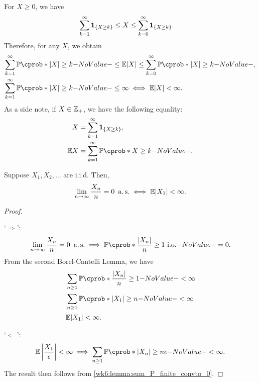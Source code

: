 \documentclass[12pt]{article}
\begin{document}
%
For $X \geq 0$, we have
\begin{align*}
\sum_{k=1}^{\infty} {\bf 1}_{\{X \geq k\}} &\leq X \leq \sum_{k=0}^{\infty} {\bf 1}_{\{X \geq k\}}.
\end{align*}
Therefore, for any $X$, we obtain
\begin{align*}
\sum_{k=1}^{\infty} \P(|X| \geq k) &\leq \E |X| \leq \sum_{k=0}^{\infty} \P(|X| \geq k),\\
\sum_{k=1}^{\infty} \P(|X| \geq k) &\leq \infty \iff \E |X| < \infty.
\end{align*}
As a side note, if $X \in \mathbb{Z}_{+}$, we have the following equality:
\begin{align*}
X &= \sum_{k=1}^{\infty} \indicatore{\{X \geq k\}},\\
\E X &= \sum_{k=1}^{\infty} \P(X \geq k).
\end{align*}
%
\begin{Lemma}
Suppose $X_1, X_2, \ldots$ are i.i.d. Then,
\begin{align*}
\lim_{n \to \infty} \frac{X_n}{n} = 0\ \as \iff \E |X_1| < \infty.
\end{align*}
\end{Lemma}
\begin{proof}\

`$\Rightarrow$':
\begin{align*}
\lim_{n \to \infty} \frac{X_n}{n} = 0\ \as \implies \P(\frac{|X_n|}{n} \geq 1 \io)=0.
\end{align*}
From the second Borel-Cantelli Lemma, we have
\begin{align*}
&\sum_{n \geq 1}\P(\frac{|X_n|}{n} \geq 1) < \infty \\
&\sum_{n \geq 1}\P(|X_1| \geq n) < \infty \\
&\E |X_1| < \infty.
\end{align*}

`$\Leftarrow$':
\begin{align*}
\E \left|\frac{X_1}{\epsilon}\right| < \infty
\implies
\sum_{n \geq 1}\P(|X_n| \geq n \epsilon) < \infty.
\end{align*}
The result then follows from \cref{wk6:lemma:sum_P_finite_convto_0}.
\end{proof}

%

\end{document}
